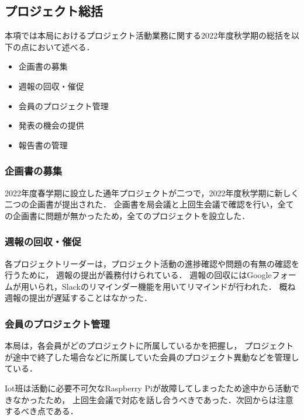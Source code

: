 \subsection*{プロジェクト総括}


本項では本局におけるプロジェクト活動業務に関する2022年度秋学期の総括を以下の点において述べる．

\begin{itemize}
  \item 企画書の募集
  \item 週報の回収・催促
  \item 会員のプロジェクト管理
  \item 発表の機会の提供
  \item 報告書の管理
\end{itemize}

\subsubsection*{企画書の募集}

2022年度春学期に設立した通年プロジェクトが二つで，2022年度秋学期に新しく二つの企画書が提出された．
企画書を局会議と上回生会議で確認を行い，全ての企画書に問題が無かったため，全てのプロジェクトを設立した．

\subsubsection*{週報の回収・催促}

各プロジェクトリーダーは，プロジェクト活動の進捗確認や問題の有無の確認を行うために，
週報の提出が義務付けられている．
週報の回収にはGoogleフォームが用いられ，Slackのリマインダー機能を用いてリマインドが行われた．
概ね週報の提出が遅延することはなかった．

\subsubsection*{会員のプロジェクト管理}

本局は，各会員がどのプロジェクトに所属しているかを把握し，
プロジェクトが途中で終了した場合などに所属していた会員のプロジェクト異動などを管理している．

Iot班は活動に必要不可欠なRaspberry Piが故障してしまったため途中から活動できなかったため，
上回生会議で対応を話し合うべきであった．次回からは注意するべき点である．

